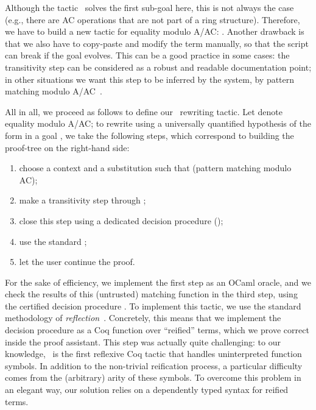 \documentclass{llncs}
\begin{document}
\noindent
Although the  tactic~\cite{gregoire-mahboubi-05} solves the
first sub-goal here, this is not always the case (e.g., there are AC
operations that are not part of a ring structure). Therefore, we have
to build a new tactic for equality modulo A/AC: \tac.
Another drawback is that we also have to copy-paste and modify the
term manually, so that the script can break if the goal evolves. This
can be a good practice in some cases: the transitivity step can be
considered as a robust and readable documentation point; in other
situations we want this step to be inferred by the system, by pattern
matching modulo A/AC~\cite{hullot}.

All in all, we proceed as follows to define our \aacrewrite\ rewriting
tactic. Let  denote equality modulo A/AC; to rewrite using a
universally quantified hypothesis of the form  in a goal , we take the following steps,
which correspond to building the proof-tree on the right-hand side:

\noindent
\begin{minipage}[t]{.55\linewidth}
\begin{enumerate}
\item \label{match-unif}choose a context  and a substitution
   such that  (pattern matching modulo
  AC);
\item \label{make-trans}make a transitivity step through ;
\item \label{close-dp} close this step using a dedicated
  decision procedure (\tac);
\item \label{rewrite}  use the standard \rewrite;
\item \label{continue} let the user continue the proof.
\end{enumerate}
\end{minipage}
\begin{minipage}[t]{.44\linewidth}
\begin{mathpar}
\end{mathpar}
\end{minipage}
\medskip

\noindent
For the sake of efficiency, we implement the first step as an OCaml
oracle, and we check the results of this (untrusted) matching function
in the third step, using the certified decision procedure \tac. To
implement this tactic, we use the standard methodology of
\emph{reflection}~\cite{BoyerMoore81,ACHA-reflection,gregoire-mahboubi-05}.
Concretely, this means that we implement the decision procedure as a
Coq function over ``reified'' terms, which we prove correct inside the
proof assistant.
This step was actually quite challenging: to our knowledge, \tac\ is
the first reflexive Coq tactic that handles uninterpreted function
symbols. In addition to the non-trivial reification process, a
particular difficulty comes from the (arbitrary) arity of these
symbols. To overcome this problem in an elegant way, our solution
relies on a dependently typed syntax for reified terms.
\end{document}
